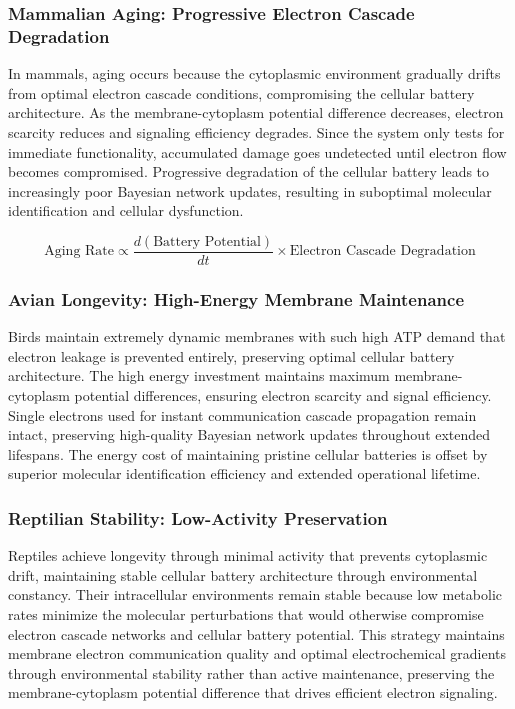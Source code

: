 \documentclass[12pt,a4paper]{article}
\begin{document}
\subsubsection{Mammalian Aging: Progressive Electron Cascade Degradation}

In mammals, aging occurs because the cytoplasmic environment gradually drifts from optimal electron cascade conditions, compromising the cellular battery architecture. As the membrane-cytoplasm potential difference decreases, electron scarcity reduces and signaling efficiency degrades. Since the system only tests for immediate functionality, accumulated damage goes undetected until electron flow becomes compromised. Progressive degradation of the cellular battery leads to increasingly poor Bayesian network updates, resulting in suboptimal molecular identification and cellular dysfunction.

\begin{equation}
\text{Aging Rate} \propto \frac{d(\text{Battery Potential})}{dt} \times \text{Electron Cascade Degradation}
\end{equation}

\subsubsection{Avian Longevity: High-Energy Membrane Maintenance}

Birds maintain extremely dynamic membranes with such high ATP demand that electron leakage is prevented entirely, preserving optimal cellular battery architecture. The high energy investment maintains maximum membrane-cytoplasm potential differences, ensuring electron scarcity and signal efficiency. Single electrons used for instant communication cascade propagation remain intact, preserving high-quality Bayesian network updates throughout extended lifespans. The energy cost of maintaining pristine cellular batteries is offset by superior molecular identification efficiency and extended operational lifetime.

\subsubsection{Reptilian Stability: Low-Activity Preservation}

Reptiles achieve longevity through minimal activity that prevents cytoplasmic drift, maintaining stable cellular battery architecture through environmental constancy. Their intracellular environments remain stable because low metabolic rates minimize the molecular perturbations that would otherwise compromise electron cascade networks and cellular battery potential. This strategy maintains membrane electron communication quality and optimal electrochemical gradients through environmental stability rather than active maintenance, preserving the membrane-cytoplasm potential difference that drives efficient electron signaling.
\end{document}
